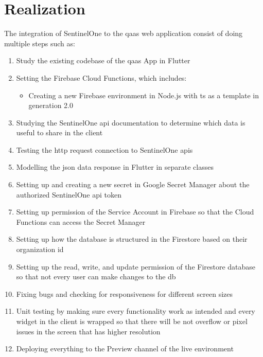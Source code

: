 \chapter{Realization}

The integration of SentinelOne to the \acrshort{qaas} web application consist of doing multiple steps such as:
\begin{enumerate}
  \item Study the existing codebase of the \acrshort{qaas} App in Flutter
  \item Setting the Firebase Cloud Functions, which includes:
        \begin{itemize}
          \item Creating a new Firebase environment in Node.js with \acrshort{ts} as a template in generation 2.0
        \end{itemize}
  \item Studying the SentinelOne \acrshort{api} documentation to determine which data is useful to share in the client
  \item Testing the \acrshort{http} request connection to SentinelOne \acrshort{api}s
  \item Modelling the \acrshort{json} data response in Flutter in separate classes
  \item Setting up and creating a new secret in Google Secret Manager about the authorized SentinelOne \acrshort{api} token
  \item Setting up permission of the Service Account in Firebase so that the Cloud Functions can access the Secret Manager
  \item Setting up how the database is structured in the Firestore based on their organization \acrshort{id}
  \item Setting up the read, write, and update permission of the Firestore database so that not every user can make changes to the
        \acrshort{db}
  \item Fixing bugs and checking for responsiveness for different screen sizes
  \item Unit testing by making sure every functionality work as intended and every widget in the client is wrapped so that there will
        be not overflow or pixel issues in the screen that has higher resolution
  \item Deploying everything to the Preview channel of the live environment
\end{enumerate}


